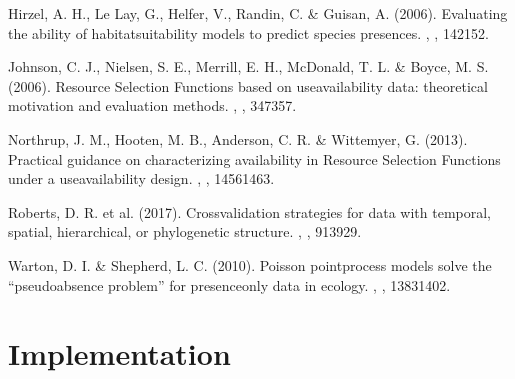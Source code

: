 \documentclass[letterpaper,10pt,english]{sphinxmanual}
\begin{document}
\sphinxAtStartPar
Hirzel, A. H., Le Lay, G., Helfer, V., Randin, C. \& Guisan, A. (2006). Evaluating the ability of habitat\sphinxhyphen{}suitability models to predict species presences. , , 142\textendash{}152.

\sphinxAtStartPar
Johnson, C. J., Nielsen, S. E., Merrill, E. H., McDonald, T. L. \& Boyce, M. S. (2006). Resource Selection Functions based on use\textendash{}availability data: theoretical motivation and evaluation methods. , , 347\textendash{}357.

\sphinxAtStartPar
Northrup, J. M., Hooten, M. B., Anderson, C. R. \& Wittemyer, G. (2013). Practical guidance on characterizing availability in Resource Selection Functions under a use\textendash{}availability design. , , 1456\textendash{}1463.

\sphinxAtStartPar
Roberts, D. R. et al. (2017). Cross\sphinxhyphen{}validation strategies for data with temporal, spatial, hierarchical, or phylogenetic structure. , , 913\textendash{}929.

\sphinxAtStartPar
Warton, D. I. \& Shepherd, L. C. (2010). Poisson point\sphinxhyphen{}process models solve the “pseudo\sphinxhyphen{}absence problem” for presence\sphinxhyphen{}only data in ecology. , , 1383\textendash{}1402.

\sphinxstepscope


\chapter{Implementation}
\label{\detokenize{implementation:implementation}}\label{\detokenize{implementation::doc}}
\end{document}
